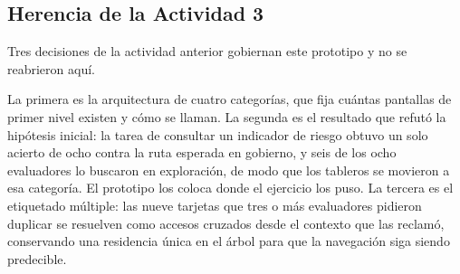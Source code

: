 \subsection{Herencia de la Actividad 3}

Tres decisiones de la actividad anterior gobiernan este prototipo y no se reabrieron aquí.

La primera es la arquitectura de cuatro categorías, que fija cuántas pantallas de primer nivel
existen y cómo se llaman. La segunda es el resultado que refutó la hipótesis inicial: la tarea de
consultar un indicador de riesgo obtuvo un solo acierto de ocho contra la ruta esperada en gobierno,
y seis de los ocho evaluadores lo buscaron en exploración, de modo que los tableros se movieron a esa
categoría. El prototipo los coloca donde el ejercicio los puso. La tercera es el etiquetado múltiple:
las nueve tarjetas que tres o más evaluadores pidieron duplicar se resuelven como accesos cruzados
desde el contexto que las reclamó, conservando una residencia única en el árbol para que la
navegación siga siendo predecible.
